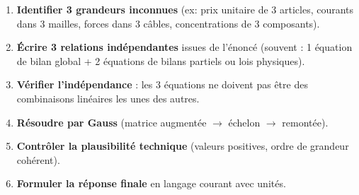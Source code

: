\documentclass[11pt]{article}
\begin{document}
\begin{methode}
\begin{enumerate}
\item \textbf{Identifier 3 grandeurs inconnues} (ex: prix unitaire de 3 articles, courants dans 3 mailles, forces dans 3 câbles, concentrations de 3 composants).
\item \textbf{Écrire 3 relations indépendantes} issues de l'énoncé (souvent : 1 équation de bilan global + 2 équations de bilans partiels ou lois physiques).
\item \textbf{Vérifier l'indépendance} : les 3 équations ne doivent pas être des combinaisons linéaires les unes des autres.
\item \textbf{Résoudre par Gauss} (matrice augmentée $\to$ échelon $\to$ remontée).
\item \textbf{Contrôler la plausibilité technique} (valeurs positives, ordre de grandeur cohérent).
\item \textbf{Formuler la réponse finale} en langage courant avec unités.
\end{enumerate}
\end{methode}
\end{document}
